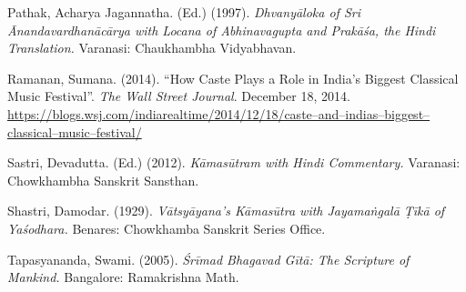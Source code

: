 \begin{thebibliography}{99}
  Pathak, Acharya Jagannatha. (Ed.) (1997). \textit{Dhvanyāloka of Sri Ānandavardhanācārya with Locana of Abhinavagupta and Prakāśa, the Hindi Translation.} Varanasi: Chaukhambha Vidyabhavan.

  Ramanan, Sumana. (2014). “How Caste Plays a Role in India’s Biggest Classical Music Festival”. \textit{The Wall Street Journal}. December 18, 2014. \url{https://blogs.wsj.com/indiarealtime/2014/12/18/caste–and–indias–biggest–classical–music–festival/}

  Sastri, Devadutta. (Ed.) (2012). \textit{Kāmasūtram with Hindi Commentary.} Varanasi: Chowkhambha Sanskrit Sansthan.

  Shastri, Damodar. (1929). \textit{Vātsyāyana’s Kāmasūtra with Jayamaṅgalā Ṭīkā of Yaśodhara.} Benares: Chowkhamba Sanskrit Series Office.

  Tapasyananda, Swami. (2005). \textit{Śrīmad Bhagavad Gītā: The Scripture of Mankind.} Bangalore: Ramakrishna Math.

 \end{thebibliography}

\theendnotes


